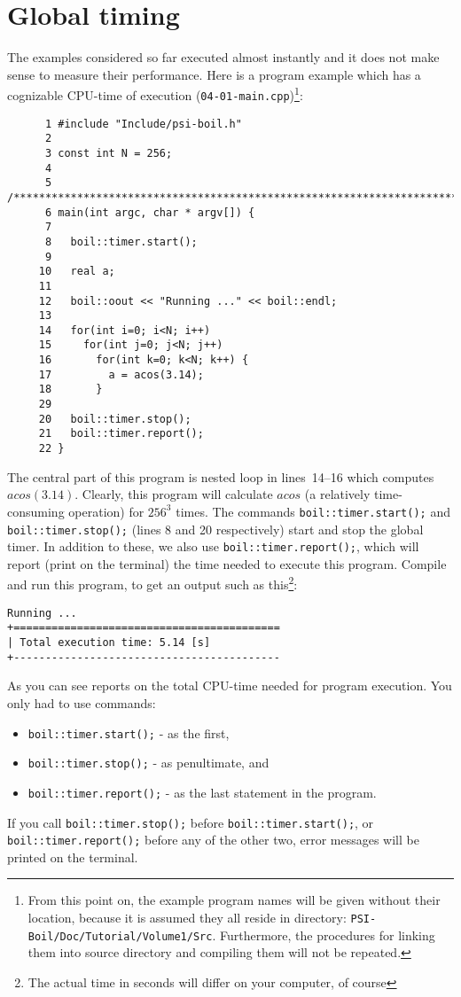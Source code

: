 \section{Global timing}
\label{sec_global}

The examples considered so far executed almost instantly and it does not
make sense to measure their performance. Here is a program example
which has a cognizable CPU-time of execution ({\tt 04-01-main.cpp})\footnote{From
this point on, the example program names will be given without their location,
because it is assumed they all reside in directory: {\tt PSI-Boil/Doc/Tutorial/Volume1/Src}.
Furthermore, the procedures for linking them into source directory and compiling
them will not be repeated.}:
%
{\small \begin{verbatim}
      1 #include "Include/psi-boil.h"
      2
      3 const int N = 256;
      4
      5 /****************************************************************************/
      6 main(int argc, char * argv[]) {
      7
      8   boil::timer.start();
      9
     10   real a;
     11
     12   boil::oout << "Running ..." << boil::endl;
     13
     14   for(int i=0; i<N; i++)
     15     for(int j=0; j<N; j++)
     16       for(int k=0; k<N; k++) {
     17         a = acos(3.14);
     18       }
     29
     20   boil::timer.stop();
     21   boil::timer.report();
     22 }
\end{verbatim}}
%
The central part of this program is nested loop in lines~14--16 which computes
$acos(3.14)$. Clearly, this program will calculate $acos$ (a relatively 
time-consuming operation) for $256^3$ times. The commands {\tt boil::timer.start();}
and {\tt boil::timer.stop();} (lines 8 and 20 respectively) start and stop the 
global timer. In addition to these, we also use {\tt boil::timer.report();}, which
will report (print on the terminal) the time needed to execute this program. 
Compile and run this program, to get an output such as this\footnote{The actual 
time in seconds will differ on your computer, of course}: 
%
{\small \begin{verbatim}
Running ...
+==========================================
| Total execution time: 5.14 [s]
+------------------------------------------
\end{verbatim}}
%
As you can see {\psiboil} reports on the total CPU-time needed for program 
execution. You only had to use commands:
%
\begin{itemize}
  \item {\tt boil::timer.start();} - as the first,
  \item {\tt boil::timer.stop();} - as penultimate, and
  \item {\tt boil::timer.report();} - as the last statement in the program.
\end{itemize}
%
If you call {\tt boil::timer.stop();} before {\tt boil::timer.start();}, or
{\tt boil::timer.report();} before any of the other two, error messages will
be printed on the terminal.

